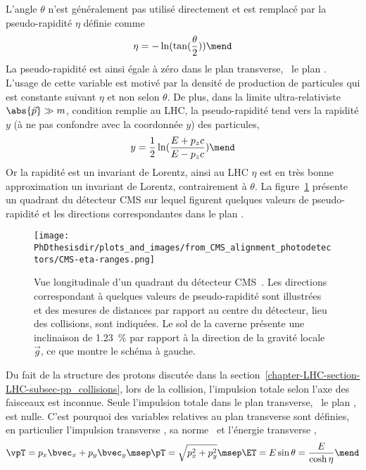 \par L'angle $\theta$ n'est généralement pas utilisé directement et est remplacé par la \og pseudo-rapidité \fg{} $\eta$ définie comme
\begin{equation}
\eta = - \ln(\tan(\frac{\theta}{2}))
\mend
\label{eq-chapter-LHC-section-CMS-subsec-overview_and_coordinates-eta_definition}
\end{equation}
La pseudo-rapidité est ainsi égale à zéro dans le plan transverse, \ie\ le plan .
L'usage de cette variable est motivé par la densité de production de particules qui est constante suivant $\eta$ et non selon $\theta$.
De plus, dans la limite \og ultra-relativiste \fg{} \ie\ $\abs{\vec{p}}\gg m$, condition remplie au LHC, la pseudo-rapidité tend vers la rapidité $y$ (à ne pas confondre avec la coordonnée $y$) des particules,
\begin{equation}
y = \frac{1}{2} \ln(\frac{E+p_zc}{E-p_zc})
\mend
\end{equation}
Or la rapidité est un invariant de Lorentz, ainsi au LHC $\eta$ est en très bonne approximation un invariant de Lorentz, contrairement à $\theta$.
La figure~\ref{fig-chapter-LHC-section-CMS-subsec-overview_and_coordinates-CMS-eta-ranges} présente un quadrant du détecteur CMS sur lequel figurent quelques valeurs de pseudo-rapidité et les directions correspondantes dans le plan .
\begin{figure}[h]
\centering
\texttt{[image: \\PhDthesisdir/plots\_and\_images/from\_CMS\_alignment\_photodetectors/CMS-eta-ranges.png]}
\caption[Vue longitudinale d'un quadrant du détecteur CMS.]{Vue longitudinale d'un quadrant du détecteur CMS~\cite{CMS_alignment_photodetectors}. Les directions correspondant à quelques valeurs de pseudo-rapidité sont illustrées et des mesures de distances par rapport au centre du détecteur, lieu des collisions, sont indiquées. Le sol de la caverne présente une inclinaison de \SI{1.23}{\%} par rapport à la direction de la gravité locale $\vec{g}$, ce que montre le schéma à gauche.}
\label{fig-chapter-LHC-section-CMS-subsec-overview_and_coordinates-CMS-eta-ranges}
\end{figure}
\par Du fait de la structure des protons discutée dans la section~\ref{chapter-LHC-section-LHC-subsec-pp_collisions}, lors de la collision, l'impulsion totale selon l'axe des faisceaux est inconnue.
Seule l'impulsion totale dans le plan transverse, \ie\ le plan , est nulle.
C'est pourquoi des variables relatives au plan transverse sont définies, en particulier l'impulsion transverse \vpT, sa norme \pT\ et l'\og énergie transverse \fg{} \ET,
\begin{equation}
\vpT = p_x\bvec_x + p_y\bvec_y
\msep
\pT = \sqrt{p_x^2+p_y^2}
\msep
\ET = E\sin\theta = \frac{E}{\cosh\eta}
\mend
\end{equation}